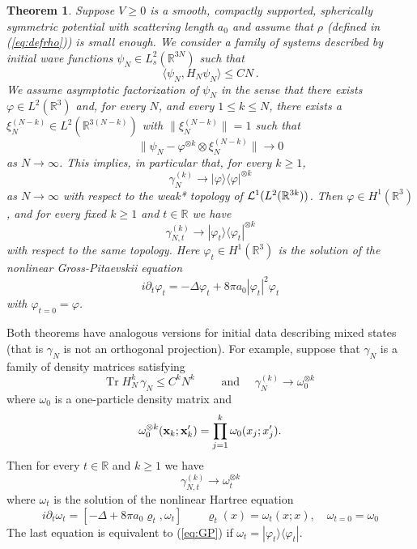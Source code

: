 \documentclass[11pt]{article}
\newtheorem{theorem}{Theorem}[section]
\newcommand{\bx}{{\bf x}}
\newcommand{\ph}{\varphi}
\newcommand{\bR}{{\mathbb R}}
\newcommand{\tr}{\mbox{Tr}}
\newcommand{\cL}{{\cal L}}
\begin{document}
\begin{theorem}\label{thm:main2}
Suppose $V \geq 0$ is a smooth, compactly supported, spherically
symmetric potential with scattering length $a_0$ and assume that
$\rho$ (defined in (\ref{eq:defrho})) is small enough. We consider a
family of systems described by initial wave functions $\psi_N \in
L_s^2 (\bR^{3N})$ such that
\begin{equation}\label{eq:thm2ass1}
\langle \psi_N , H_N \psi_N \rangle \leq C N \,.
\end{equation}
We assume asymptotic factorization of $\psi_N$ in the sense that
there exists $\ph \in L^2 (\bR^3)$ and, for every $N$, and every $1
\leq k \leq N$, there exists a $\xi^{(N-k)}_N \in L^2
(\bR^{3(N-k)})$ with $\| \xi_N^{(N-k)} \| =1$ such that
\begin{equation}\label{eq:thm2ass2}
\| \psi_N - \ph^{\otimes k} \otimes \xi_N^{(N-k)} \| \to 0
\end{equation}
as $N \to \infty$. This implies, in particular that, for every $k
\geq 1$,
\begin{equation}\label{eq:thm2ass3}
\gamma_N^{(k)} \to |\ph \rangle \langle \ph|^{\otimes k}
\end{equation}
as $N \to \infty$ with respect to the weak* topology of $\cL^1 (L^2
(\bR^{3k}))$. Then $\ph \in H^1 (\bR^3)$, and for every fixed $k
\geq 1$ and $t \in \bR$ we have
\begin{equation}\label{eq:convgamma}
\gamma_{N,t}^{(k)} \to |\ph_t \rangle \langle \ph_t |^{\otimes k}
\end{equation}
with respect to the same topology. Here $\ph_t \in H^1 (\bR^3)$ is
the solution of the nonlinear Gross-Pitaevskii equation
\begin{equation}
i\partial_t \ph_t = -\Delta \ph_t + 8\pi a_0 |\ph_t|^2 \ph_t
\end{equation}
with $\ph_{t=0} = \ph$.
\end{theorem}

Both theorems have analogous versions for initial data describing
mixed states (that is $\gamma_N$ is not an orthogonal projection).
For example, suppose that  $\gamma_N$ is a family of density
matrices satisfying \begin{equation}\label{eq:condomega} \tr \;
H_N^k \, \gamma_N \leq C^k N^k \qquad \text{ and } \quad
 \gamma_N^{(k)} \to \omega_0^{\otimes k} \end{equation}
where $\omega_0$ is a one-particle density matrix and
\[ \omega_0^{\otimes k} (\bx_k; \bx'_k) = \prod_{j=1}^k \omega_0
(x_j ; x'_j) .
\]
Then for every $t \in \bR$ and $k \geq 1$ we have
\begin{equation}\label{eq:thmomega}
\gamma_{N,t}^{(k)} \to \omega_t^{\otimes k}
\end{equation}
where $\omega_t$ is the solution of the nonlinear Hartree equation
\begin{equation}
i\partial_t \omega_t = [ -\Delta + 8\pi a_0 \varrho_t , \omega_t]
\qquad  \varrho_t (x) = \omega_t (x;x), \quad \omega_{t=0} =
\omega_{0}
\end{equation}
The last equation is equivalent to (\ref{eq:GP}) if $\omega_t
=|\ph_t \rangle \langle \ph_t|$.
\end{document}
